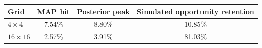 \begin{tabular}{lccc}
\toprule
Grid & MAP hit & Posterior peak & Simulated opportunity retention \\
\midrule
$4\times4$ & 7.54\% & 8.80\% & 10.85\% \\
$16\times16$ & 2.57\% & 3.91\% & 81.03\% \\
\bottomrule
\end{tabular}
